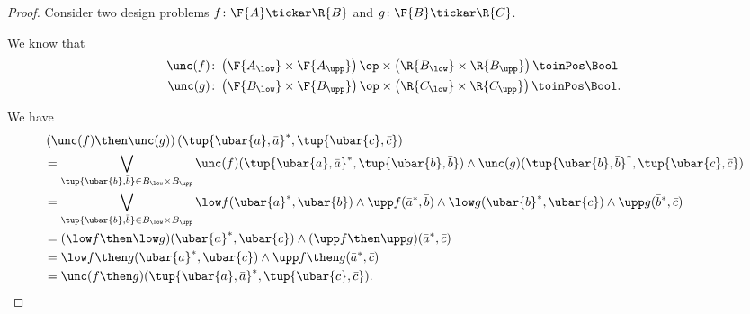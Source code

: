 \begin{proof}
Consider two design problems $f\colon \F{A}\tickar \R{B}$ and $g\colon \F{B}\tickar \R{C}$. 

We know that
\begin{equation}
    \begin{aligned}
    \unc(f)&\colon \left( \F{A_{\low}}\times \F{A_{\upp}}\right)\op \times \left( \R{B_{\low}}\times \R{B_{\upp}}\right)\toinPos \Bool\\
    \unc(g)&\colon \left( \F{B_{\low}}\times \F{B_{\upp}}\right)\op \times \left( \R{C_{\low}}\times \R{C_{\upp}}\right)\toinPos \Bool.
    \end{aligned}
\end{equation}

We have
\begin{equation}
    \begin{aligned}
    &\left(\unc(f)\then \unc(g)\right) (\tup{\ubar{a},\bar{a}}^*,\tup{\ubar{c},\bar{c}})\\
    &=\bigvee_{\tup{\ubar{b},\bar{b}}\in B_{\low}\times B_{\upp}} \unc(f)(\tup{\ubar{a},\bar{a}}^*,\tup{\ubar{b},\bar{b}})\wedge \unc(g)(\tup{\ubar{b},\bar{b}}^*,\tup{\ubar{c},\bar{c}})\\
    &= \bigvee_{\tup{\ubar{b},\bar{b}}\in B_{\low}\times B_{\upp}} \low f(\ubar{a}^*,\ubar{b})\wedge \upp f(\bar{a}^*,\bar{b})\wedge \low g(\ubar{b}^*,\ubar{c})\wedge \upp g(\bar{b}^*,\bar{c})\\
    &=(\low f\then \low g)(\ubar{a}^*,\ubar{c})\wedge (\upp f\then \upp g)(\bar{a}^*,\bar{c})\\
    &=\low f\then g (\ubar{a}^*,\ubar{c})\wedge \upp f\then g(\bar{a}^*,\bar{c})\\
    &=\unc(f\then g)(\tup{\ubar{a},\bar{a}}^*,\tup{\ubar{c},\bar{c}}).
    \end{aligned}
\end{equation}
\end{proof}


